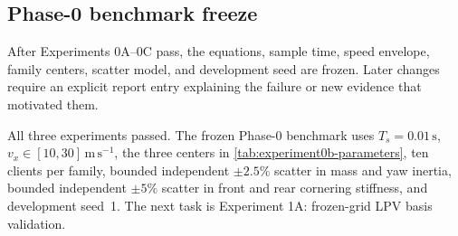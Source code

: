 \subsection{Phase-0 benchmark freeze}
After Experiments 0A--0C pass, the equations, sample time, speed envelope, family
centers, scatter model, and development seed are frozen. Later changes require an
explicit report entry explaining the failure or new evidence that motivated them.

All three experiments passed. The frozen Phase-0 benchmark uses
$T_s=0.01\,\mathrm{s}$, $v_x\in[10,30]\,\mathrm{m\,s^{-1}}$, the three centers in
\cref{tab:experiment0b-parameters}, ten clients per family, bounded independent
$\pm2.5\%$ scatter in mass and yaw inertia, bounded independent $\pm5\%$ scatter
in front and rear cornering stiffness, and development seed~1. The next task is
Experiment 1A: frozen-grid LPV basis validation.
